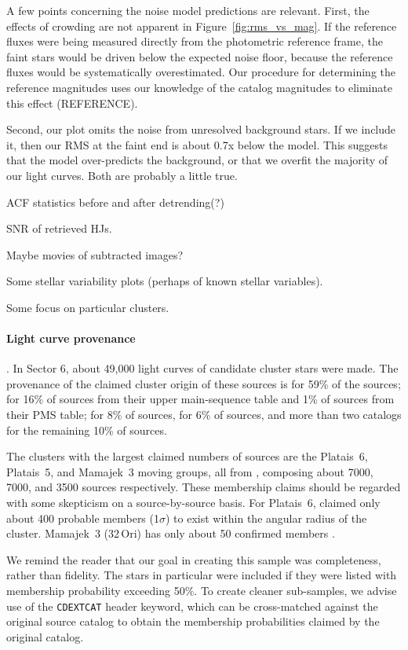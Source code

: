 \documentclass[12pt,twocolumn,tighten]{aastex62}
\begin{document}
A few points concerning the noise model predictions are relevant.
First, the effects of crowding are not apparent in 
Figure~\ref{fig:rms_vs_mag}. 
If the reference fluxes were being measured directly from the photometric 
reference frame, the faint stars would be driven below the expected noise 
floor, because the reference fluxes would be systematically overestimated.
Our procedure for determining the reference magnitudes uses our knowledge of 
the catalog magnitudes to eliminate this effect (REFERENCE).

Second, our plot omits the noise from unresolved background stars.
If we include it, then our RMS at the faint end is about 0.7x below the model.
This suggests that the model over-predicts the background, or that we overfit 
the majority of our light curves. Both are probably a little true.

ACF statistics before and after detrending(?)

SNR of retrieved HJs.

Maybe movies of subtracted images?

Some stellar variability plots (perhaps of known stellar variables).

Some focus on particular clusters.

\paragraph{Light curve provenance}.
In Sector 6, about 49{,}000 light curves of candidate cluster stars
were made. The provenance of the claimed cluster origin of these
sources is \citet{dias_proper_2014} for 59\% of the sources;
\citet{zari_3d_2018} for 16\% of sources from their upper
main-sequence table and 1\% of sources from their PMS table;
\citet{Kharchenko_et_al_2013} for 8\% of sources,
\citet{cantat-gaudin_gaia_2018} for 6\% of sources, and more than two
catalogs for the remaining 10\% of sources.

The clusters with the largest claimed numbers of sources are the
Platais~6, Platais~5, and Mamajek~3 moving groups, all from
\citet{dias_proper_2014}, composing about 7000, 7000, and 3500 sources
respectively. These membership claims should be regarded with some
skepticism on a source-by-source basis.  For Platais~6,
\citet{Kharchenko_et_al_2013} claimed only about 400 probable members
(1$\sigma$) to exist within the angular radius of the cluster.
Mamajek~3 (32$\,$Ori) has only about 50 confirmed members
\citep{bell_32ori_2017}.

We remind the reader that our goal in creating this sample was
completeness, rather than fidelity. The \citet{dias_proper_2014} stars
in particular were included if they were listed with membership
probability exceeding 50\%.  To create cleaner sub-samples, we advise
use of the \texttt{CDEXTCAT} header keyword, which can be
cross-matched against the original source catalog to obtain the
membership probabilities claimed by the original catalog.
\end{document}
